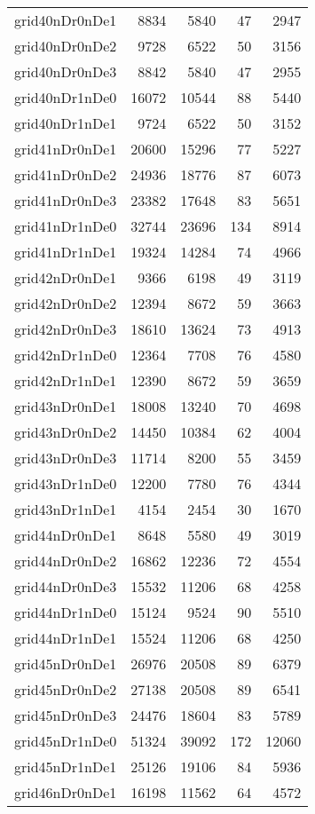 \begin{tabular}{lrrrr}
grid40nDr0nDe1 & 8834 & 5840 & 47 & 2947 \\
grid40nDr0nDe2 & 9728 & 6522 & 50 & 3156 \\
grid40nDr0nDe3 & 8842 & 5840 & 47 & 2955 \\
grid40nDr1nDe0 & 16072 & 10544 & 88 & 5440 \\
grid40nDr1nDe1 & 9724 & 6522 & 50 & 3152 \\
grid41nDr0nDe1 & 20600 & 15296 & 77 & 5227 \\
grid41nDr0nDe2 & 24936 & 18776 & 87 & 6073 \\
grid41nDr0nDe3 & 23382 & 17648 & 83 & 5651 \\
grid41nDr1nDe0 & 32744 & 23696 & 134 & 8914 \\
grid41nDr1nDe1 & 19324 & 14284 & 74 & 4966 \\
grid42nDr0nDe1 & 9366 & 6198 & 49 & 3119 \\
grid42nDr0nDe2 & 12394 & 8672 & 59 & 3663 \\
grid42nDr0nDe3 & 18610 & 13624 & 73 & 4913 \\
grid42nDr1nDe0 & 12364 & 7708 & 76 & 4580 \\
grid42nDr1nDe1 & 12390 & 8672 & 59 & 3659 \\
grid43nDr0nDe1 & 18008 & 13240 & 70 & 4698 \\
grid43nDr0nDe2 & 14450 & 10384 & 62 & 4004 \\
grid43nDr0nDe3 & 11714 & 8200 & 55 & 3459 \\
grid43nDr1nDe0 & 12200 & 7780 & 76 & 4344 \\
grid43nDr1nDe1 & 4154 & 2454 & 30 & 1670 \\
grid44nDr0nDe1 & 8648 & 5580 & 49 & 3019 \\
grid44nDr0nDe2 & 16862 & 12236 & 72 & 4554 \\
grid44nDr0nDe3 & 15532 & 11206 & 68 & 4258 \\
grid44nDr1nDe0 & 15124 & 9524 & 90 & 5510 \\
grid44nDr1nDe1 & 15524 & 11206 & 68 & 4250 \\
grid45nDr0nDe1 & 26976 & 20508 & 89 & 6379 \\
grid45nDr0nDe2 & 27138 & 20508 & 89 & 6541 \\
grid45nDr0nDe3 & 24476 & 18604 & 83 & 5789 \\
grid45nDr1nDe0 & 51324 & 39092 & 172 & 12060 \\
grid45nDr1nDe1 & 25126 & 19106 & 84 & 5936 \\
grid46nDr0nDe1 & 16198 & 11562 & 64 & 4572 \\

\end{tabular}
